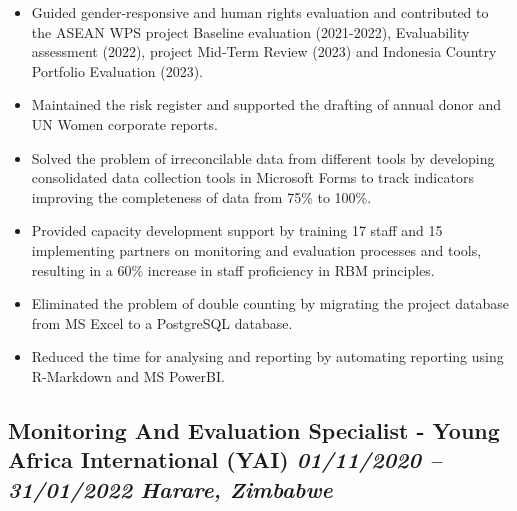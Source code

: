 \documentclass[
  10pt,
]{article}
\providecommand{\tightlist}{%
  \setlength{\itemsep}{0pt}\setlength{\parskip}{0pt}}
\begin{document}
\begin{itemize}
\tightlist
\item
  Guided gender-responsive and human rights evaluation and contributed
  to the ASEAN WPS project Baseline evaluation (2021-2022), Evaluability
  assessment (2022), project Mid-Term Review (2023) and Indonesia
  Country Portfolio Evaluation (2023).
\item
  Maintained the risk register and supported the drafting of annual
  donor and UN Women corporate reports.
\item
  Solved the problem of irreconcilable data from different tools by
  developing consolidated data collection tools in Microsoft Forms to
  track indicators improving the completeness of data from 75\% to
  100\%.
\item
  Provided capacity development support by training 17 staff and 15
  implementing partners on monitoring and evaluation processes and
  tools, resulting in a 60\% increase in staff proficiency in RBM
  principles.
\item
  Eliminated the problem of double counting by migrating the project
  database from MS Excel to a PostgreSQL database.
\item
  Reduced the time for analysing and reporting by automating reporting
  using R-Markdown and MS PowerBI.
\end{itemize}

\subsection{\texorpdfstring{Monitoring And Evaluation Specialist - Young
Africa International (YAI) \emph{01/11/2020 -- 31/01/2022} \textbar{}
\emph{Harare,
Zimbabwe}}{Monitoring And Evaluation Specialist - Young Africa International (YAI) 01/11/2020 -- 31/01/2022 \textbar{} Harare, Zimbabwe}}\label{monitoring-and-evaluation-specialist---young-africa-international-yai-01112020-31012022-harare-zimbabwe}
\end{document}
